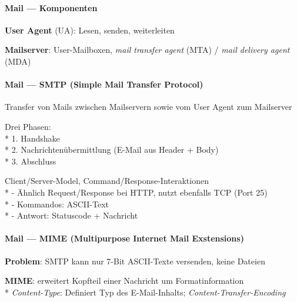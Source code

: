 \paragraph{Mail --- Komponenten}
\begin{items}
  \item \textbf{User Agent} (UA): Lesen, senden, weiterleiten
  \item \textbf{Mailserver}: User-Mailboxen, \emph{mail transfer agent} (MTA) / \emph{mail delivery agent} (MDA)
\end{items}

\paragraph{Mail --- SMTP (Simple Mail Transfer Protocol)}
\begin{items}
	\item Transfer von Mails zwischen Mailservern sowie vom User Agent zum Mailserver
  \item Drei Phasen: \\*
    1. Handshake \\*
    2. Nachrichtenübermittlung (E-Mail aus Header + Body) \\*
    3. Abschluss
  \item Client/Server-Model, Command/Response-Interaktionen \\*
    - Ähnlich Request/Response bei HTTP, nutzt ebenfalls TCP (Port 25) \\*
    - Kommandos: ASCII-Text \\*
    - Antwort: Statuscode + Nachricht
\end{items}

\paragraph{Mail --- MIME (Multipurpose Internet Mail Exstensions)}
\begin{items}
  \item \textbf{Problem}: SMTP kann nur 7-Bit ASCII-Texte versenden, keine Dateien
  \item \textbf{MIME}: erweitert Kopfteil einer Nachricht um Formatinformation \\*
    \emph{Content-Type}: Definiert Typ des E-Mail-Inhalts; \emph{Content-Transfer-Encoding}
\end{items}

